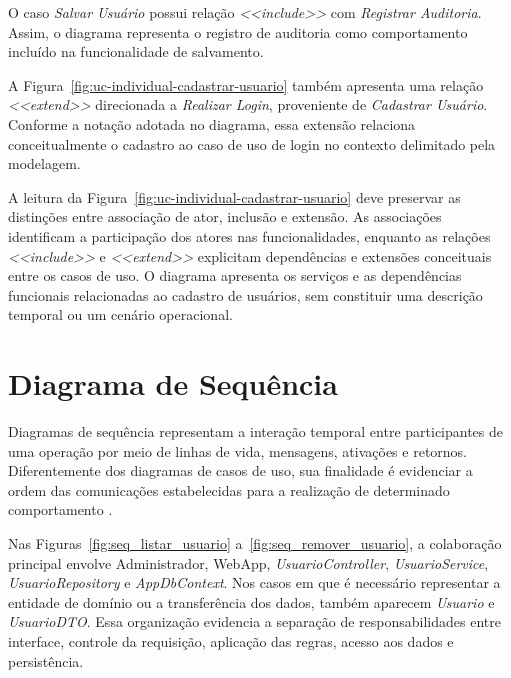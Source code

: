 O caso \textit{Salvar Usuário} possui relação \textit{\textless{}\textless{}include\textgreater{}\textgreater{}} com \textit{Registrar Auditoria}. Assim, o diagrama representa o registro de auditoria como comportamento incluído na funcionalidade de salvamento.

A Figura~\ref{fig:uc-individual-cadastrar-usuario} também apresenta uma relação \textit{\textless{}\textless{}extend\textgreater{}\textgreater{}} direcionada a \textit{Realizar Login}, proveniente de \textit{Cadastrar Usuário}. Conforme a notação adotada no diagrama, essa extensão relaciona conceitualmente o cadastro ao caso de uso de login no contexto delimitado pela modelagem.

A leitura da Figura~\ref{fig:uc-individual-cadastrar-usuario} deve preservar as distinções entre associação de ator, inclusão e extensão. As associações identificam a participação dos atores nas funcionalidades, enquanto as relações \textit{\textless{}\textless{}include\textgreater{}\textgreater{}} e \textit{\textless{}\textless{}extend\textgreater{}\textgreater{}} explicitam dependências e extensões conceituais entre os casos de uso. O diagrama apresenta os serviços e as dependências funcionais relacionadas ao cadastro de usuários, sem constituir uma descrição temporal ou um cenário operacional.

\section{Diagrama de Sequência}

\label{sec:diagrama-sequencia-civitas-final}

Diagramas de sequência representam a interação temporal entre participantes de uma operação por meio de linhas de vida, mensagens, ativações e retornos. Diferentemente dos diagramas de casos de uso, sua finalidade é evidenciar a ordem das comunicações estabelecidas para a realização de determinado comportamento \parencite{omg2017uml,larman2005}.

Nas Figuras~\ref{fig:seq_listar_usuario} a~\ref{fig:seq_remover_usuario}, a colaboração principal envolve Administrador, WebApp, \textit{UsuarioController}, \textit{UsuarioService}, \textit{UsuarioRepository} e \textit{AppDbContext}. Nos casos em que é necessário representar a entidade de domínio ou a transferência dos dados, também aparecem \textit{Usuario} e \textit{UsuarioDTO}. Essa organização evidencia a separação de responsabilidades entre interface, controle da requisição, aplicação das regras, acesso aos dados e persistência.


